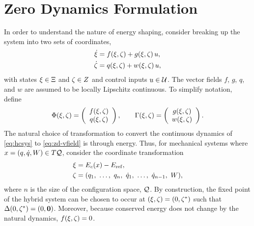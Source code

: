 \section{Zero Dynamics Formulation} \label{sec:zd-form}

In order to understand the nature of energy shaping, consider breaking up the
system into two sets of coordinates,
%
\begin{align}
  \nonumber
  \dot {\xi} &= f(\xi, \zeta) + g(\xi, \zeta) \, u,\\
  \dot {\zeta} &= q(\xi, \zeta) + w(\xi, \zeta) \, u,
  \label{eq:zd-vfield}
\end{align}
%
with states $\xi \in \Xi$ and $\zeta \in Z$ and control inputs $u \in
\mathcal{U}$.
%
The vector fields $f$, $g$, $q$, and $w$ are assumed to be locally Lipschitz
continuous.
%
To simplify notation, define
%
\begin{align*}
  \Phi(\xi, \zeta) = \left(\begin{array}{c}
    f(\xi, \zeta)\\
    q(\xi, \zeta)
  \end{array}\right), \qquad
  \Gamma (\xi, \zeta) = \left(\begin{array}{c}
    g(\xi, \zeta)\\
    w(\xi, \zeta)
  \end{array}\right).
\end{align*}
%
The natural choice of transformation to convert the continuous dynamics of
\eqref{eq:hcsys} to \eqref{eq:zd-vfield} is through energy.
%
Thus, for mechanical systems where $x = (q, \dot{q}, W) \in T\mathcal{Q}$, consider the
coordinate transformation
%
\begin{align*}
  \xi &= E_{c}(x) - E_{\mathrm{ref}},\\
  \zeta &= (q_{1}, \ \ldots, \ q_{n}, \ \dot{q}_{1}, \ \ldots, \ \dot{q}_{n-1}, \ W),
\end{align*}
where $n$ is the size of the configuration space, $\mathcal{Q}$.
%
By construction, the fixed point of the hybrid system can be chosen to occur at
$(\xi, \zeta) = (0, \zeta^{*})$ such that $\Delta(0, \zeta^{*}) = (0, {\mathbf 0})$.
%
Moreover, because conserved energy does not change by the natural dynamics,
$f(\xi, \zeta) = 0$.
%


